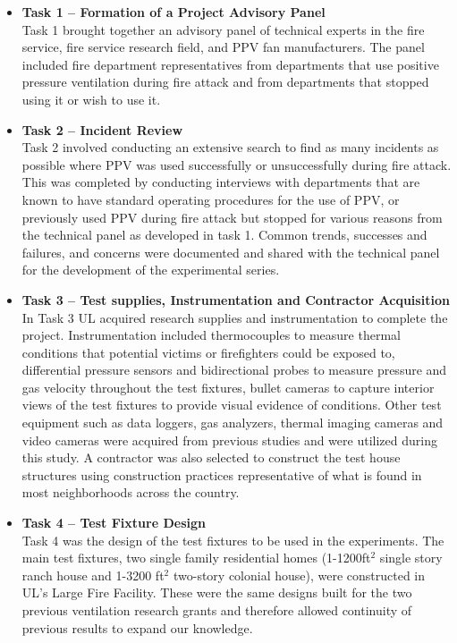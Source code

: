 \documentclass{article}
\begin{document}
\begin{itemize}
	\item \textbf{Task 1 – Formation of a Project Advisory Panel} \\ 
	Task 1 brought together an advisory panel of technical experts in the fire service, fire service research field, and PPV fan manufacturers. The panel included fire department representatives from departments that use positive pressure ventilation during fire attack and from departments that stopped using it or wish to use it. 
	
	\item \textbf{Task 2 – Incident Review} \\
	Task 2 involved conducting an extensive search to find as many incidents as possible where PPV was used successfully or unsuccessfully during fire attack. This was completed by conducting interviews with departments that are known to have standard operating procedures for the use of PPV, or previously used PPV during fire attack but stopped for various reasons from the technical panel as developed in task 1. Common trends, successes and failures, and concerns were documented and shared with the technical panel for the development of the experimental series. 
	
	\item \textbf{Task 3 – Test supplies, Instrumentation and Contractor Acquisition} \\
	In Task 3 UL acquired research supplies and instrumentation to complete the project. Instrumentation included thermocouples to measure thermal conditions that potential victims or firefighters could be exposed to, differential pressure sensors and bidirectional probes to measure pressure and gas velocity throughout the test fixtures, bullet cameras to capture interior views of the test fixtures to provide visual evidence of conditions. Other test equipment such as data loggers, gas analyzers, thermal imaging cameras and video cameras were acquired from previous studies and were utilized during this study. A contractor was also selected to construct the test house structures using construction practices representative of what is found in most neighborhoods across the country.
	
	\item \textbf{Task 4 – Test Fixture Design} \\
	Task 4 was the design of the test fixtures to be used in the experiments. The main test fixtures, two single family residential homes (1-1200ft$^2$ single story ranch house and 1-3200 ft$^2$ two-story colonial house), were constructed in UL’s Large Fire Facility. These were the same designs built for the two previous ventilation research grants and therefore allowed continuity of previous results to expand our knowledge.
	

\end{itemize}
\end{document}
